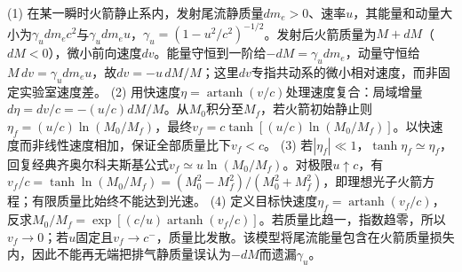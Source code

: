 (1) 在某一瞬时火箭静止系内，发射尾流静质量\(dm_e>0\)、速率\(u\)，其能量和动量大小为\(\gamma_u dm_ec^2\)与\(\gamma_udm_eu\)，\(\gamma_u=(1-u^2/c^2)^{-1/2}\)。发射后火箭质量为\(M+dM\)（\(dM<0\)），微小前向速度\(dv\)。能量守恒到一阶给\(-dM=\gamma_udm_e\)，动量守恒给\(M\,dv=\gamma_udm_eu\)，故\(dv=-u\,dM/M\)；这里\(dv\)专指共动系的微小相对速度，而非固定实验室速度差。
(2) 用快速度\(\eta=\operatorname{artanh}(v/c)\)处理速度复合：局域增量\(d\eta=dv/c=-(u/c)dM/M\)。从\(M_0\)积分至\(M_f\)，若火箭初始静止则\(\eta_f=(u/c)\ln(M_0/M_f)\)，最终\(v_f=c\tanh[(u/c)\ln(M_0/M_f)]\)。以快速度而非线性速度相加，保证全部质量比下\(v_f<c\)。
(3) 若\(|\eta_f|\ll1\)，\(\tanh\eta_f\simeq\eta_f\)，回复经典齐奥尔科夫斯基公式\(v_f\simeq u\ln(M_0/M_f)\)。对极限\(u\uparrow c\)，有\(v_f/c=\tanh\ln(M_0/M_f)=(M_0^2-M_f^2)/(M_0^2+M_f^2)\)，即理想光子火箭方程；有限质量比始终不能达到光速。
(4) 定义目标快速度\(\eta_f=\operatorname{artanh}(v_f/c)\)，反求\(M_0/M_f=\exp[(c/u)\operatorname{artanh}(v_f/c)]\)。若质量比趋一，指数趋零，所以\(v_f\to0\)；若\(u\)固定且\(v_f\to c^-\)，质量比发散。该模型将尾流能量包含在火箭质量损失内，因此不能再无端把排气静质量误认为\(-dM\)而遗漏\(\gamma_u\)。
